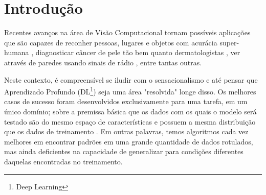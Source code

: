 \documentclass[
12pt, %
a4paper, %
onecolumn, %
]{article}
\begin{document}
\pagestyle{myheadings} %


\thispagestyle{plain} %

\printcover %




  
  

  



\thispagestyle{plain}
\setcounter{page}{2}
\onehalfspacing

\section{Introdução}

Recentes avanços na área de Visão Computacional tornam possíveis aplicações que são capazes de reconher pessoas, lugares e objetos com acurácia super-humana \cite{fei}, diagnosticar câncer de pele tão bem quanto dermatologistas \cite{skin_cancer_doi:10.1093/annonc/mdy166},  ver através de paredes usando sinais de rádio \cite{wifi}, entre tantas outras. 


Neste contexto, é compreensível se iludir com o sensacionalismo e até pensar que Aprendizado Profundo (DL\footnote{Deep Learning}) seja uma área "resolvida" \textemdash longe disso. Os melhores casos de sucesso foram desenvolvidos exclusivamente para uma tarefa, em um único domínio; sobre a premissa básica que os dados com os quais o modelo será testado são do mesmo espaço de características e possuem a mesma distribuição que os dados de treinamento \cite{Pan}. Em outras palavras, temos algoritmos cada vez melhores em encontrar padrões em uma grande quantidade de dados rotulados, mas ainda deficientes na capacidade de generalizar para condições diferentes daquelas encontradas no treinamento. 
\end{document}
